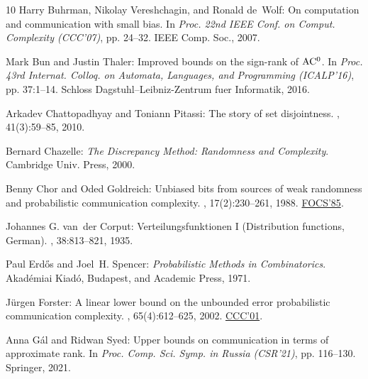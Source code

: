 \begin{thebibliography}{10}
{\sc Harry Buhrman, Nikolay Vereshchagin, and Ronald de~Wolf}: On computation
  and communication with small bias.
\newblock In {\em Proc. 22nd IEEE Conf. on Comput. Complexity (CCC'07)}, pp.
  24--32. IEEE Comp. Soc., 2007.

{\sc Mark Bun and Justin Thaler}: Improved bounds on the sign-rank of {$\rm
  AC^0$}.
\newblock In {\em Proc. 43rd Internat. Colloq. on Automata, Languages, and
  Programming (ICALP'16)}, pp. 37:1--14. Schloss Dagstuhl--Leibniz-Zentrum fuer
  Informatik, 2016.

{\sc Arkadev Chattopadhyay and Toniann Pitassi}: The story of set disjointness.
, 41(3):59--85, 2010.
\newblock [\epfmtdoi{10.1145/1855118.1855133}]

{\sc Bernard Chazelle}: {\em The Discrepancy Method: Randomness and
  Complexity}.
\newblock Cambridge Univ. Press, 2000.

{\sc Benny Chor and Oded Goldreich}: Unbiased bits from sources of weak
  randomness and probabilistic communication complexity.
, 17(2):230--261, 1988.
\newblock \prelim \href{https://doi.org/10.1109/SFCS.1985.62}{FOCS'85}.
\newblock [\epfmtdoi{10.1137/0217015}]

{\sc Johannes G. van~der Corput}: Verteilungsfunktionen {I} ({D}istribution
  functions, {G}erman).
, 38:813--821, 1935.

{\sc Paul Erd\H{o}s and Joel~H. Spencer}: {\em Probabilistic Methods in
  Combinatorics}.
\newblock Akad\'emiai Kiad\'o, Budapest, and Academic Press, 1971.

{\sc J{\"u}rgen Forster}: A linear lower bound on the unbounded error
  probabilistic communication complexity.
, 65(4):612--625, 2002.
\newblock \prelim \href{https://doi.org/10.1109/CCC.2001.933877}{CCC'01}.
\newblock [\epfmtdoi{10.1016/S0022-0000(02)00019-3}]

{\sc Anna G\'{a}l and Ridwan Syed}: Upper bounds on communication in terms of
  approximate rank.
\newblock In {\em Proc. Comp. Sci. Symp. in Russia (CSR'21)}, pp. 116--130.
  Springer, 2021.


\end{thebibliography}

